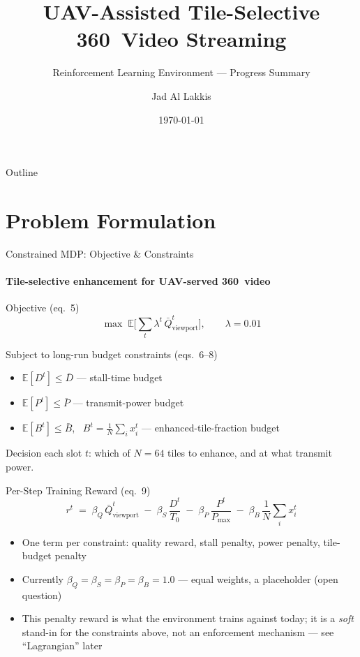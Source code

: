 \documentclass[aspectratio=169]{beamer}
\title[UAV 360\textdegree\ Streaming RL]{UAV-Assisted Tile-Selective 360\textdegree\ Video Streaming}
\subtitle{Reinforcement Learning Environment --- Progress Summary}
\author{Jad Al Lakkis}
\date{\today}
\begin{document}
\begin{frame}
  \titlepage
\end{frame}

\begin{frame}{Outline}
  \tableofcontents
\end{frame}

\section{Problem Formulation}

\begin{frame}{Constrained MDP: Objective \& Constraints}
  \framesubtitle{Tile-selective enhancement for UAV-served 360\textdegree\ video}

  \begin{block}{Objective (eq.\ 5)}
    \[ \max \; \mathbb{E}\Big[\textstyle\sum_t \lambda^t \, \bar Q^t_{\text{viewport}}\Big], \qquad \lambda = 0.01 \]
  \end{block}

  \begin{block}{Subject to long-run budget constraints (eqs.\ 6--8)}
    \begin{itemize}
      \item $\mathbb{E}[D^t] \le \bar D$ \quad --- stall-time budget
      \item $\mathbb{E}[P^t] \le \bar P$ \quad --- transmit-power budget
      \item $\mathbb{E}[B^t] \le \bar B$, \ $B^t = \frac{1}{N}\sum_i x_i^t$ \quad --- enhanced-tile-fraction budget
    \end{itemize}
  \end{block}

  \vspace{2pt}
  Decision each slot $t$: which of $N{=}64$ tiles to enhance, and at what transmit power.
\end{frame}

\begin{frame}{Per-Step Training Reward (eq.\ 9)}
  \[ r^t \;=\; \beta_Q\,\bar Q^t_{\text{viewport}} \;-\; \beta_S\,\frac{D^t}{T_0} \;-\; \beta_P\,\frac{P^t}{P_{\max}} \;-\; \beta_B\,\frac{1}{N}\sum_i x_i^t \]

  \begin{itemize}
    \item One term per constraint: quality reward, stall penalty, power penalty, tile-budget penalty
    \item Currently $\beta_Q=\beta_S=\beta_P=\beta_B=1.0$ --- equal weights, a placeholder (open question)
    \item This penalty reward is what the environment trains against today; it is a \emph{soft} stand-in for the constraints above, not an enforcement mechanism --- see ``Lagrangian'' later
  \end{itemize}
\end{frame}
\end{document}
